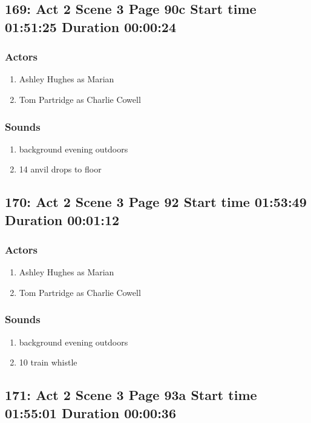 \subsection{169: Act 2 Scene 3 Page 90c Start time 01:51:25 Duration 00:00:24}

\subsubsection{Actors}
\begin{enumerate}
\item Ashley Hughes as Marian
\item Tom Partridge as Charlie Cowell
\end{enumerate}

\subsubsection{Sounds}
\begin{enumerate}
\item background evening outdoors
\item 14 anvil drops to floor
\end{enumerate}
\subsection{170: Act 2 Scene 3 Page 92 Start time 01:53:49 Duration 00:01:12}

\subsubsection{Actors}
\begin{enumerate}
\item Ashley Hughes as Marian
\item Tom Partridge as Charlie Cowell
\end{enumerate}

\subsubsection{Sounds}
\begin{enumerate}
\item background evening outdoors
\item 10 train whistle
\end{enumerate}
\subsection{171: Act 2 Scene 3 Page 93a Start time 01:55:01 Duration 00:00:36}


